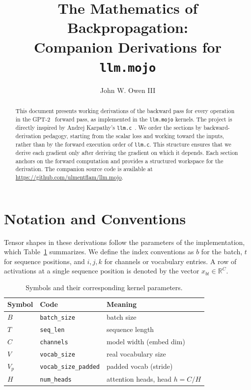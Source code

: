 \documentclass[letterpaper, 10 pt, conference]{ieeeconf}
\title{\LARGE \bf
The Mathematics of Backpropagation:\\
Companion Derivations for \texttt{llm.mojo}
}
\author{John W. Owen III}
\newcommand{\R}{\mathbb{R}}
\theoremstyle{definition}
\begin{document}
\maketitle

\begin{abstract}
  This document presents working derivations of the backward pass for every
  operation in the GPT-2~\cite{gpt2} forward pass, as implemented in the \texttt{llm.mojo}
  kernels. The project is directly inspired by Andrej Karpathy's \texttt{llm.c}~\cite{llmc}.
  We order the sections by backward-derivation pedagogy, starting from the scalar loss
  and working toward the inputs, rather than by the forward execution order of \texttt{llm.c}.
  This structure ensures that we derive each gradient only after deriving the gradient on
  which it depends. Each section anchors on the forward computation and provides a structured
  workspace for the derivation. The companion source code is available at \url{https://github.com/ulmentflam/llm.mojo}.
\end{abstract}

\tableofcontents

\section{Notation and Conventions}\label{sec:notation}

Tensor shapes in these derivations follow the parameters of the implementation, which Table~\ref{tab:notation} summarizes. We define the index conventions as $b$ for the batch, $t$ for sequence positions, and $i, j, k$ for channels or vocabulary entries. A row of activations at a single sequence position is denoted by the vector $x_{bt} \in \R^{C}$.

\begin{table}[t]
  \centering
  \caption{Symbols and their corresponding kernel parameters.}
  \label{tab:notation}
  \begin{tabular}{@{}lll@{}}
    \toprule
    Symbol & Code                         & Meaning                       \\
    \midrule
    $B$    & \texttt{batch\_size}         & batch size                    \\
    $T$    & \texttt{seq\_len}            & sequence length               \\
    $C$    & \texttt{channels}            & model width (embed dim)       \\
    $V$    & \texttt{vocab\_size}         & real vocabulary size          \\
    $V_p$  & \texttt{vocab\_size\_padded} & padded vocab (stride)         \\
    $H$    & \texttt{num\_heads}          & attention heads, head $h=C/H$ \\
    \bottomrule
  \end{tabular}
\end{table}
\end{document}
